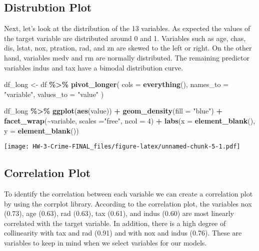 \documentclass[
]{article}
\newenvironment{Shaded}{\begin{snugshade}}{\end{snugshade}}
\newcommand{\AttributeTok}[1]{\textcolor[rgb]{0.13,0.29,0.53}{#1}}
\newcommand{\DecValTok}[1]{\textcolor[rgb]{0.00,0.00,0.81}{#1}}
\newcommand{\FunctionTok}[1]{\textcolor[rgb]{0.13,0.29,0.53}{\textbf{#1}}}
\newcommand{\NormalTok}[1]{#1}
\newcommand{\OtherTok}[1]{\textcolor[rgb]{0.56,0.35,0.01}{#1}}
\newcommand{\SpecialCharTok}[1]{\textcolor[rgb]{0.81,0.36,0.00}{\textbf{#1}}}
\newcommand{\StringTok}[1]{\textcolor[rgb]{0.31,0.60,0.02}{#1}}
\begin{document}
\hypertarget{distrubtion-plot}{%
\subsection{Distrubtion Plot}\label{distrubtion-plot}}

Next, let's look at the distribution of the 13 variables. As expected
the values of the target variable are distributed around 0 and 1.
Variables such as age, chas, dis, lstat, nox, ptration, rad, and zn are
skewed to the left or right. On the other hand, variables medv and rm
are normally distributed. The remaining predictor variables indus and
tax have a bimodal distribution curve.

\begin{Shaded}
\begin{Highlighting}[]
\NormalTok{df\_long }\OtherTok{\textless{}{-}}\NormalTok{ df }\SpecialCharTok{\%\textgreater{}\%}
  \FunctionTok{pivot\_longer}\NormalTok{(}
    \AttributeTok{cols =} \FunctionTok{everything}\NormalTok{(), }
    \AttributeTok{names\_to =} \StringTok{"variable"}\NormalTok{,}
    \AttributeTok{values\_to =} \StringTok{"value"}
\NormalTok{  )}

\NormalTok{df\_long }\SpecialCharTok{\%\textgreater{}\%}
  \FunctionTok{ggplot}\NormalTok{(}\FunctionTok{aes}\NormalTok{(value)) }\SpecialCharTok{+} 
  \FunctionTok{geom\_density}\NormalTok{(}\AttributeTok{fill =} \StringTok{"blue"}\NormalTok{) }\SpecialCharTok{+} 
  \FunctionTok{facet\_wrap}\NormalTok{(}\SpecialCharTok{\textasciitilde{}}\NormalTok{variable, }\AttributeTok{scales =}\StringTok{"free"}\NormalTok{, }\AttributeTok{ncol =} \DecValTok{4}\NormalTok{) }\SpecialCharTok{+}
  \FunctionTok{labs}\NormalTok{(}\AttributeTok{x =} \FunctionTok{element\_blank}\NormalTok{(), }\AttributeTok{y =} \FunctionTok{element\_blank}\NormalTok{())}
\end{Highlighting}
\end{Shaded}

\texttt{[image: HW-3-Crime-FINAL\_files/figure-latex/unnamed-chunk-5-1.pdf]}

\hypertarget{correlation-plot}{%
\subsection{Correlation Plot}\label{correlation-plot}}

To identify the correlation between each variable we can create a
correlation plot by using the corrplot library. According to the
correlation plot, the variables nox (0.73), age (0.63), rad (0.63), tax
(0.61), and indus (0.60) are most linearly correlated with the target
variable. In addition, there is a high degree of collinearity with tax
and rad (0.91) and with nox and indus (0.76). These are variables to
keep in mind when we select variables for our models.
\end{document}
